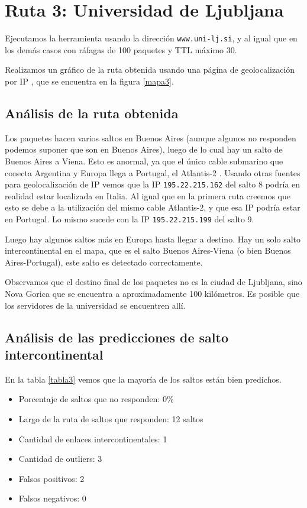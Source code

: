 \section{Ruta 3: Universidad de Ljubljana}

Ejecutamos la herramienta usando la dirección \texttt{www.uni-lj.si}, y al igual que en los demás casos con ráfagas de 100 paquetes y TTL máximo 30.

Realizamos un gráfico de la ruta obtenida usando una página de geolocalización por IP \cite{ip2location}, que se encuentra en la figura \ref{mapa3}.

\subsection{Análisis de la ruta obtenida}

Los paquetes hacen varios saltos en Buenos Aires (aunque algunos no responden podemos suponer que son en Buenos Aires), luego de lo cual hay un salto de Buenos Aires a Viena. Esto es anormal, ya que el único cable submarino que conecta Argentina y Europa llega a Portugal, el Atlantis-2 \cite{atlantis2}. Usando otras fuentes para geolocalización de IP vemos que la IP \texttt{195.22.215.162} del salto 8 podría en realidad estar localizada en Italia. Al igual que en la primera ruta creemos que esto se debe a la utilización del mismo cable Atlantis-2, y que esa IP podría estar en Portugal. Lo mismo sucede con la IP \texttt{195.22.215.199} del salto 9.

Luego hay algunos saltos más en Europa hasta llegar a destino. Hay un solo salto intercontinental en el mapa, que es el salto Buenos Aires-Viena (o bien Buenos Aires-Portugal), este salto es detectado correctamente.

Observamos que el destino final de los paquetes no es la ciudad de Ljubljana, sino Nova Gorica que se encuentra a aproximadamente 100 kilómetros. Es posible que los servidores de la universidad se encuentren allí.

\subsection{Análisis de las predicciones de salto intercontinental}

En la tabla \ref{tabla3} vemos que la mayoría de los saltos están bien predichos.

\begin{itemize}
	\item Porcentaje de saltos que no responden: 0\%
	\item Largo de la ruta de saltos que responden: 12 saltos 
	\item Cantidad de enlaces intercontinentales: 1
	\item Cantidad de outliers: 3
	\item Falsos positivos: 2
	\item Falsos negativos: 0
\end{itemize}

